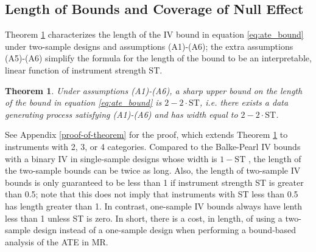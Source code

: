 \documentclass[
]{article}
\theoremstyle{plain}
\newtheorem{theorem}{Theorem}[section]
\begin{document}
\hypertarget{length-of-bounds-and-coverage-of-null-effect}{%
\subsection{Length of Bounds and Coverage of Null Effect}\label{length-of-bounds-and-coverage-of-null-effect}}

\label{bounds-from-bivariate-data}
\label{properties-of-bounds-from-summary-level-data}

Theorem \ref{thm:upperBoundWidth} characterizes the length of the IV bound in equation \eqref{eq:ate_bound} under two-sample designs and assumptions (A1)-(A6); the extra assumptions (A5)-(A6) simplify the formula for the length of the bound to be an interpretable, linear function of instrument strength ST.

\begin{theorem}\label{thm:upperBoundWidth}
Under assumptions (A1)-(A6), a sharp upper bound on the length of the bound in equation \eqref{eq:ate_bound} is $2 - 2\cdot \text{ST}$, i.e. there exists a data generating process satisfying (A1)-(A6) and has width equal to $2 - 2\cdot \text{ST}$.
\end{theorem}

See Appendix \ref{proof-of-theorem} for the proof, which extends Theorem \ref{thm:upperBoundWidth} to instruments with 2, 3, or 4 categories. Compared to the Balke-Pearl IV bounds with a binary IV in single-sample designs whose width is \(1-\text{ST}\) \autocite{balke_bounds_1997}, the length of the two-sample bounds can be twice as long. Also, the length of two-sample IV bounds is only guaranteed to be less than 1 if instrument strength ST is greater than 0.5; note that this does not imply that instruments with ST less than 0.5 has length greater than 1. In contrast, one-sample IV bounds always have lenth less than 1 unless ST is zero. In short, there is a cost, in length, of using a two-sample design instead of a one-sample design when performing a bound-based analysis of the ATE in MR.
\end{document}
